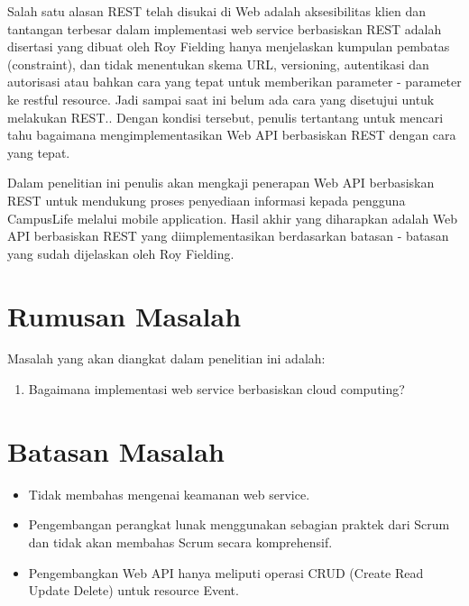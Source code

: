 \documentclass[a4paper, 12pt]{report}
\begin{document}
\onehalfspacing Salah satu alasan REST telah disukai di Web adalah aksesibilitas klien dan tantangan terbesar dalam implementasi web service berbasiskan REST adalah disertasi yang dibuat oleh Roy Fielding hanya menjelaskan kumpulan pembatas (constraint), dan tidak menentukan skema URL, versioning, autentikasi dan autorisasi atau bahkan cara yang tepat untuk memberikan parameter - parameter ke restful resource. Jadi sampai saat ini belum ada cara yang disetujui untuk melakukan REST.\cite{programmableweb-apis}. Dengan kondisi tersebut, penulis tertantang untuk mencari tahu bagaimana mengimplementasikan Web API berbasiskan REST dengan cara yang tepat.

\onehalfspacing Dalam penelitian ini penulis akan mengkaji penerapan Web API berbasiskan REST untuk mendukung proses penyediaan informasi kepada pengguna CampusLife melalui mobile application. Hasil akhir yang diharapkan adalah Web API berbasiskan REST yang diimplementasikan berdasarkan batasan - batasan yang sudah dijelaskan oleh Roy Fielding.

\section*{Rumusan Masalah}
\onehalfspacing 
\begin{flushleft}
Masalah yang akan diangkat dalam penelitian ini adalah:
\begin{enumerate}
  \item Bagaimana implementasi web service berbasiskan cloud computing?
\end{enumerate}
\end{flushleft}

\section*{Batasan Masalah}
\onehalfspacing
\begin{flushleft}
\begin{itemize}
  \item Tidak membahas mengenai keamanan web service.
  \item Pengembangan perangkat lunak menggunakan sebagian praktek dari Scrum dan tidak akan membahas Scrum secara komprehensif.
  \item Pengembangkan Web API hanya meliputi operasi CRUD (Create Read Update Delete) untuk resource Event.
\end{itemize}
\end{flushleft}
\end{document}

